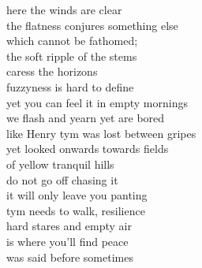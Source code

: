 here the winds are clear\\
the flatness conjures something else\\
which cannot be fathomed;\\
the soft ripple of the stems\\
caress the horizons\\

fuzzyness is hard to define\\
yet you can feel it in empty mornings\\
we flash and yearn yet are bored\\
like Henry tym was lost between gripes\\
yet looked onwards towards fields\\
of yellow tranquil hills\\

do not go off chasing it\\
it will only leave you panting\\
tym needs to walk, resilience\\
hard stares and empty air\\
is where you'll find peace\\
was said before sometimes\\
